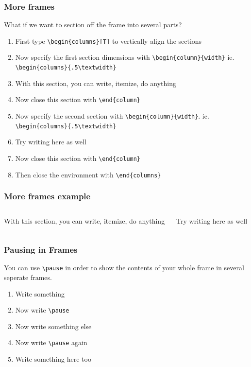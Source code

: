 \documentclass[nogin]{beamer}\usepackage[]{graphicx}\usepackage[]{color}
\begin{document}
\begin{frame}[fragile]
\frametitle{More frames}
\footnotesize
What if we want to section off the frame into several parts?
\scriptsize
\begin{enumerate}
\item First type \verb|\begin{columns}[T]| to vertically align the sections
\item Now specify the first section dimensions  with \verb|\begin{column}{width}| ie. \verb|\begin{columns}{.5\textwidth}|
\item With this section, you can write, itemize, do anything
\item Now close this section with \verb|\end{column}|
\item Now specify the second section with \verb|\begin{column}{width}|. ie. \verb|\begin{columns}{.5\textwidth}|
\item Try writing here as well
\item Now close this section with \verb|\end{column}|
\item Then close the environment with \verb|\end{columns}|
\end{enumerate}
\end{frame}

\begin{frame}
\frametitle{More frames example}
\begin{columns}[T]
\begin{column}{.5\textwidth}
With this section, you can write, itemize, do anything
\end{column}
\begin{column}{.5\textwidth}
Try writing here as well
\end{column}
\end{columns}
\end{frame}

\begin{frame}[fragile]
\frametitle{Pausing in Frames}
You can use \verb|\pause| in order to show the contents of your whole frame in several seperate frames.
\begin{enumerate}
\item Write something
\item Now write \verb|\pause|
\item Now write something else
\item Now write \verb|\pause| again
\item Write something here too
\end{enumerate}
\end{frame}
\end{document}
